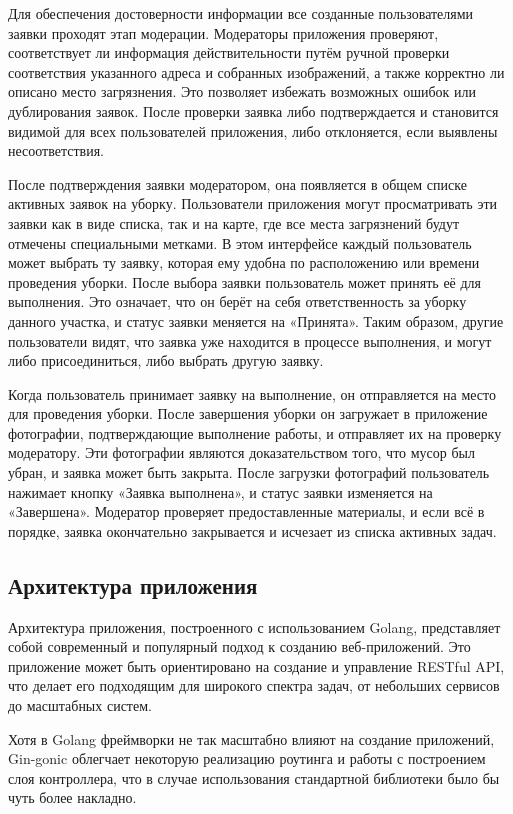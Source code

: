 \documentclass[diploma]{SCWorks}
\begin{document}
Для обеспечения достоверности информации все созданные пользователями заявки 
проходят этап модерации. Модераторы приложения проверяют, соответствует ли 
информация действительности путём ручной проверки соответствия 
указанного адреса и собранных изображений, а также корректно ли описано место 
загрязнения. Это позволяет избежать возможных ошибок или дублирования заявок. 
После проверки заявка либо подтверждается и становится видимой для 
всех пользователей приложения, либо отклоняется, если выявлены несоответствия.

После подтверждения заявки модератором, она появляется в общем списке активных 
заявок на уборку. Пользователи приложения могут просматривать эти заявки 
как в виде списка, так и на карте, где все места загрязнений будут отмечены 
специальными метками. В этом интерфейсе каждый пользователь может выбрать ту 
заявку, которая ему удобна по расположению или времени проведения уборки. 
После выбора заявки пользователь может принять её для выполнения. Это 
означает, что он берёт на себя ответственность за уборку данного участка, 
и статус заявки меняется на «Принята». Таким образом, другие пользователи 
видят, что заявка уже находится в процессе выполнения, и могут либо 
присоединиться, либо выбрать другую заявку.

Когда пользователь принимает заявку на выполнение, он отправляется на место 
для проведения уборки. После завершения уборки он загружает в приложение 
фотографии, подтверждающие выполнение работы, и отправляет их на проверку 
модератору. Эти фотографии являются доказательством того, что мусор был 
убран, и заявка может быть закрыта. После загрузки фотографий пользователь 
нажимает кнопку «Заявка выполнена», и статус заявки изменяется на «Завершена».
Модератор проверяет предоставленные материалы, и если всё в порядке, заявка 
окончательно закрывается и исчезает из списка активных задач.

\subsection{Архитектура приложения}

Архитектура приложения, построенного с использованием Golang, представляет
собой современный и популярный подход к созданию веб-приложений. Это приложение 
может быть ориентировано на создание и управление RESTful API, что делает его 
подходящим для широкого спектра задач, от небольших сервисов до масштабных 
систем.

Хотя в Golang фреймворки не так масштабно влияют на создание приложений, 
Gin-gonic облегчает некоторую реализацию роутинга и работы с построением слоя
контроллера, что в случае использования стандартной библиотеки было бы чуть 
более накладно.
\end{document}
